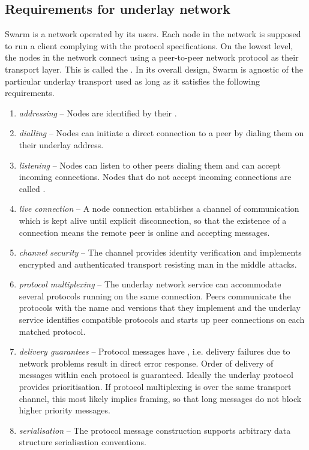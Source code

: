 \subsection{Requirements for underlay network \statusyellow}\label{sec:underlay-transport} 

\yellow{}

Swarm is a network operated by its users. Each node in the network is supposed to run a client complying with the protocol specifications. On the lowest level, the nodes in the network connect using a peer-to-peer network protocol as their transport layer. This is called the . 
In its overall design, Swarm is agnostic of the particular underlay transport used as long as it satisfies the following requirements.

\begin{enumerate}
    \item \emph{addressing} -- Nodes are identified by their .
    \item \emph{dialling} -- Nodes can initiate a direct connection to a peer by dialing them on their underlay address.
    \item \emph{listening} -- Nodes can listen to other peers dialing them and can accept incoming connections. Nodes that do not accept incoming connections are called .
    \item \emph{live connection} -- A node connection establishes a channel of communication which is kept alive until explicit disconnection, so that the existence of a connection means the remote peer is online and accepting messages.
    \item \emph{channel security} -- 
    The channel provides identity verification and implements encrypted and authenticated transport resisting man in the middle attacks.
    \item \emph{protocol multiplexing} -- 
    The underlay network service can accommodate several protocols running on the same connection. Peers communicate the protocols with the name and versions that they implement and the underlay service identifies compatible protocols and starts up peer connections on each matched protocol. 
    \item \emph{delivery guarantees} -- 
    Protocol messages have , i.e. delivery failures due to network problems result in direct error response. 
    Order of delivery of messages within each protocol is guaranteed. 
    Ideally the underlay protocol provides prioritisation. 
    If protocol multiplexing is over the same transport channel, this most likely implies framing, so that long messages do not block higher priority messages.
    \item \emph{serialisation} -- 
    The protocol message construction supports arbitrary data structure serialisation conventions.
    
\end{enumerate}

